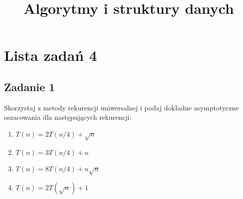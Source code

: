 \documentclass{article}
\begin{document}
\title{Algorytmy i struktury danych}
\author{}
\date{}
\maketitle

\section*{Lista zadań 4}

\subsection*{Zadanie 1}
Skorzystaj z metody rekurencji uniwersalnej i podaj dokładne asymptotyczne
oszacowania dla następujących rekurencji:
\begin{enumerate}[label=(\alph*)]
    \item $T(n) = 2T(n/4) + \sqrt{n}$
    \item $T(n) = 3T(n/4) + n$
    \item $T(n) = 8T(n/4) + n\sqrt{n}$
    \item $T(n) = 2T(\sqrt{n}) + 1$
\end{enumerate}
\end{document}
